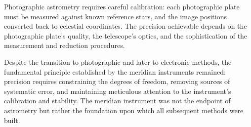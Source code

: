 Photographic astrometry requires careful calibration: each photographic plate must be measured against known reference stars, and the image positions converted back to celestial coordinates. The precision achievable depends on the photographic plate's quality, the telescope's optics, and the sophistication of the measurement and reduction procedures.

Despite the transition to photographic and later to electronic methods, the fundamental principle established by the meridian instruments remained: precision requires constraining the degrees of freedom, removing sources of systematic error, and maintaining meticulous attention to the instrument's calibration and stability. The meridian instrument was not the endpoint of astrometry but rather the foundation upon which all subsequent methods were built.
